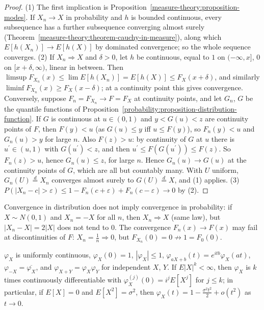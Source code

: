 \begin{proof}
(1) The first implication is Proposition~\ref{measure-theory:proposition-modes}. If $X_n \to X$ in probability and $h$ is bounded continuous, every subsequence has a further subsequence converging almost surely
(Theorem~\ref{measure-theory:theorem-cauchy-in-measure}), along which $E[h(X_n)] \to E[h(X)]$ by dominated convergence; so the whole sequence converges.
(2) If $X_n \Rightarrow X$ and $\delta > 0$, let $h$ be continuous, equal to $1$ on $(-\infty, x]$, $0$ on $[x + \delta, \infty)$, linear in between. Then $\limsup F_{X_n}(x) \leq \lim E[h(X_n)] = E[h(X)] \leq F_X(x + \delta)$, and similarly
$\liminf F_{X_n}(x) \geq F_X(x - \delta)$; at a continuity point this gives convergence. Conversely, suppose $F_n = F_{X_n} \to F = F_X$ at continuity points, and let $G_n$, $G$ be the quantile functions of
Proposition~\ref{probability:proposition-distribution-function}. If $G$ is continuous at $u \in (0, 1)$ and $y < G(u) < z$ are continuity points of $F$, then $F(y) < u$ (as $G(u) \leq y$ iff $u \leq F(y)$), so $F_n(y) < u$ and $G_n(u) > y$ for large $n$.
Also $F(z) > u$: by continuity of $G$ at $u$ there is $u^{\prime} \in (u, 1)$ with $G(u^{\prime}) < z$, and then $u^{\prime} \leq F(G(u^{\prime})) \leq F(z)$. So $F_n(z) > u$, hence $G_n(u) \leq z$, for large $n$. Hence $G_n(u) \to G(u)$ at the continuity points of $G$, which are all but countably many. With $U$ uniform, $G_n(U) \overset{d}{=} X_n$ converges almost surely to $G(U) \overset{d}{=} X$, and (1) applies.
(3) $P(|X_n - c| > \varepsilon) \leq 1 - F_n(c + \varepsilon) + F_n(c - \varepsilon) \to 0$ by (2).
\end{proof}

\begin{counterexample}\label{probability:counterexample-distribution-not-probability}
Convergence in distribution does not imply convergence in probability: if $X \sim N(0, 1)$ and $X_n = -X$ for all $n$, then $X_n \Rightarrow X$ (same law), but $|X_n - X| = 2|X|$ does not tend to $0$. The convergence $F_n(x) \to F(x)$
may fail at discontinuities of $F$: $X_n = \frac1n \Rightarrow 0$, but $F_{X_n}(0) = 0 \not\to 1 = F_0(0)$.
\end{counterexample}

\begin{proposition}\label{probability:proposition-characteristic-function-moments}
$\varphi_X$ is uniformly continuous, $\varphi_X(0) = 1$, $|\varphi_X| \leq 1$, $\varphi_{aX+b}(t) = e^{itb}\varphi_X(at)$, $\varphi_{-X} = \overline{\varphi_X}$, and $\varphi_{X+Y} = \varphi_X\varphi_Y$ for independent $X$, $Y$. If $E|X|^k < \infty$, then
$\varphi_X$ is $k$ times continuously differentiable with $\varphi_X^{(j)}(0) = i^jE[X^j]$ for $j \leq k$; in particular, if $E[X] = 0$ and $E[X^2] = \sigma^2$, then $\varphi_X(t) = 1 - \frac{\sigma^2t^2}{2} + o(t^2)$ as $t \to 0$.
\end{proposition}

